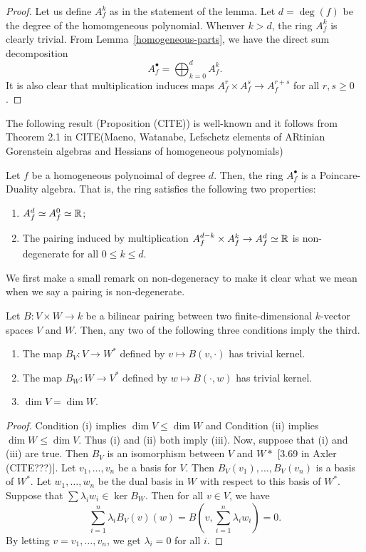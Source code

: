 \documentclass{puthesis-UG}
\begin{document}
\begin{proof}
	Let us define $A_f^k$ as in the statement of the lemma. Let $d = \deg (f)$ be the degree of the homomgeneous polynomial. Whenver $k > d$, the ring $A_f^k$ is clearly trivial. From Lemma~\ref{homogeneous-parts}, we have the direct sum decomposition 
	\[
		A_f^\bullet = \bigoplus_{k = 0}^d A_f^k.
	\]
	It is also clear that multiplication induces maps $A_f^r \times A_f^s \to A_f^{r+s}$ for all $r, s \geq 0$.
\end{proof}

The following result (Proposition (CITE)) is well-known and it follows from Theorem 2.1 in CITE(Maeno, Watanabe, Lefschetz elements of ARtinian Gorenstein algebras and Hessians of homogeneous polynomials)
\begin{prop} \label{chow-ring-is-a-PD-algebra}
	Let $f$ be a homogeneous polynoimal of degree $d$. Then, the ring $A_f^\bullet$ is a Poincare-Duality algebra. That is, the ring satisfies the following two properties:
	\begin{enumerate}[label = (\alph*)]
		\item $A_f^d \simeq A_f^0 \simeq \mathbb{R}$;

		\item The pairing induced by multiplication $A_f^{d-k} \times A_f^k \to A_f^d \simeq \mathbb{R}$ is non-degenerate for all $0 \leq k \leq d$. 
	\end{enumerate}
\end{prop}

We first make a small remark on non-degeneracy to make it clear what we mean when we say a pairing is non-degenerate. 
\begin{lem} \label{non-degeneracy-definition}
	Let $B : V \times W \to k$ be a bilinear pairing between two finite-dimensional $k$-vector spaces $V$ and $W$. Then, any two of the following three conditions imply the third. 
		\begin{enumerate}[label = (\roman*)]
			\item The map $B_V : V \to W^*$ defined by $v \mapsto B(v, \cdot)$ has trivial kernel.
			\item The map $B_W : W \to V^*$ defined by $w \mapsto B(\cdot, w)$ has trivial kernel. 
			\item $\dim V = \dim W$. 
		\end{enumerate}
	\end{lem}

	\begin{proof}
		Condition (i) implies $\dim V \leq \dim W$ and Condition (ii) implies $\dim W \leq \dim V$. Thus (i) and (ii) both imply (iii). Now, suppose that (i) and (iii) are true. Then $B_V$ is an isomorphism between $V$ and $W*$ [3.69 in Axler (CITE???)]. Let $v_1, \ldots, v_n$ be a basis for $V$. Then $B_V(v_1), \ldots, B_V(v_n)$ is a basis of $W^*$. Let $w_1, \ldots, w_n$ be the dual basis in $W$ with respect to this basis of $W^*$. Suppose that $\sum \lambda_i w_i \in \ker B_W$. Then for all $v \in V$, we have 
		\[
			\sum_{i = 1}^n \lambda_i B_V(v)(w) = B \left ( v, \sum_{i = 1}^n \lambda_i w_i \right ) = 0. 
		\]
		By letting $v = v_1, \ldots, v_n$, we get $\lambda_i = 0$ for all $i$. 
	\end{proof}
\end{document}
